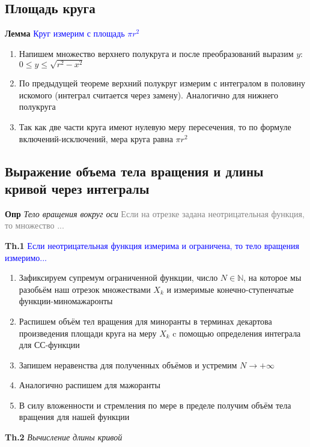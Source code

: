 \subsection{Площадь круга}

\textbf{Лемма} \textcolor{blue}{Круг измерим с площадь $\pi r^2$}

\begin{enumerate}
    \item Напишем множество верхнего полукруга и после преобразований выразим $y$: $0 \leq y \leq \sqrt{
        r^2 - x^2}$
    \item По предыдущей теореме верхний полукруг измерим с интегралом в половину искомого (интеграл считается
    через замену).
    Аналогично для нижнего полукруга
    \item Так как две части круга имеют нулевую меру пересечения, то по формуле включений-исключений, мера круга
    равна $\pi r^2$
\end{enumerate}

\subsection{Выражение объема тела вращения и длины кривой через интегралы}

\textbf{Опр} \textit{Тело вращения вокруг оси} \textcolor{gray}{Если на отрезке задана неотрицательная функция, то
множество ...}

\textbf{Th.1} \textcolor{blue}{Если неотрицательная функция измерима и ограничена, то тело вращения измеримо...}

\begin{enumerate}
    \item Зафиксируем супремум ограниченной функции, число $N \in \mathbb{N}$, на которое мы разобьём наш отрезок
    множествами $X_k$ и измеримые конечно-ступенчатые функции-миномажаронты
    \item Распишем объём тел вращения для миноранты в терминах декартова произведения площади круга на меру $X_k$ c помощью определения интеграла для СС-функции
    \item Запишем неравенства для полученных объёмов и устремим $N \rightarrow +\infty$
    \item Аналогично распишем для мажоранты
    \item В силу вложенности и стремления по мере в пределе получим объём тела вращения для нашей функции
\end{enumerate}

\textbf{Th.2} \textit{Вычисление длины кривой}


